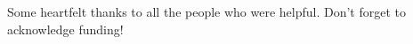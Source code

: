 Some heartfelt thanks to all the people who were helpful. Don't forget to acknowledge funding! \lipsum[1]
